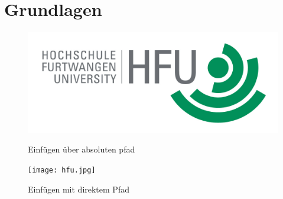 \chapter{Grundlagen}
\begin{figure}
\caption{Einfügen über absoluten pfad}
\includegraphics[width=1\textwidth]{content/pictures/hfu}
\label{pic:bild3}
\end{figure}

\begin{figure}
	\centering
		\texttt{[image: hfu.jpg]}
	\caption{Einfügen mit direktem Pfad}
	\label{La12bel}
\end{figure}